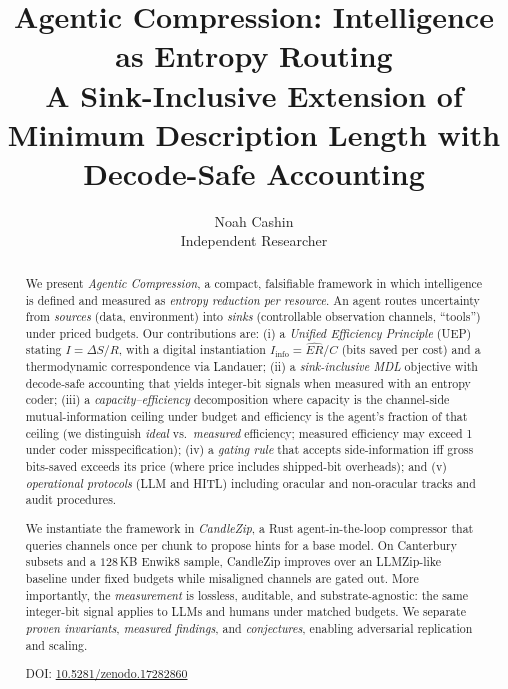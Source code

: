 \documentclass[12pt,a4paper]{article}
\title{\textbf{Agentic Compression: Intelligence as Entropy Routing}\\[4pt]
\large A Sink-Inclusive Extension of Minimum Description Length with Decode-Safe Accounting}
\author{Noah Cashin\\ \small Independent Researcher}
\date{}
\newcommand{\Iinfo}{I_{\mathrm{info}}}
\begin{document}
\maketitle

\begin{abstract}
We present \emph{Agentic Compression}, a compact, falsifiable framework in which intelligence is defined and measured as \emph{entropy reduction per resource}. An agent routes uncertainty from \emph{sources} (data, environment) into \emph{sinks} (controllable observation channels, ``tools'') under priced budgets. Our contributions are: (i) a \emph{Unified Efficiency Principle} (UEP) stating $I=\Delta S/R$, with a digital instantiation $\Iinfo=\widehat{ER}/C$ (bits saved per cost) and a thermodynamic correspondence via Landauer; (ii) a \emph{sink-inclusive MDL} objective with decode-safe accounting that yields integer-bit signals when measured with an entropy coder; (iii) a \emph{capacity--efficiency} decomposition where capacity is the channel-side mutual-information ceiling under budget and efficiency is the agent's fraction of that ceiling (we distinguish \emph{ideal} vs.\ \emph{measured} efficiency; measured efficiency may exceed 1 under coder misspecification); (iv) a \emph{gating rule} that accepts side-information iff gross bits-saved exceeds its price (where price includes shipped-bit overheads); and (v) \emph{operational protocols} (LLM and HITL) including oracular and non-oracular tracks and audit procedures.

We instantiate the framework in \emph{CandleZip}, a Rust agent-in-the-loop compressor that queries channels once per chunk to propose hints for a base model. On Canterbury subsets and a $128$\,KB Enwik8 sample, CandleZip improves over an LLMZip-like baseline under fixed budgets while misaligned channels are gated out. More importantly, the \emph{measurement} is lossless, auditable, and substrate-agnostic: the same integer-bit signal applies to LLMs and humans under matched budgets. We separate \emph{proven invariants}, \emph{measured findings}, and \emph{conjectures}, enabling adversarial replication and scaling.

DOI: \href{https://doi.org/10.5281/zenodo.17282860}{10.5281/zenodo.17282860}
\end{abstract}
\end{document}
